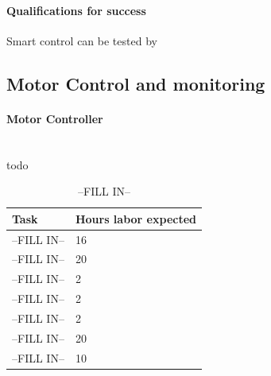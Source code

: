 \documentclass[12pt,article]{IEEEtran}
\begin{document}
	\paragraph{\bfseries Qualifications for success}
	Smart control can be tested by 
	
    \subsection{Motor Control and monitoring}
        \paragraph{Motor Controller}
        	\\todo
        
       
       
       \begin{table}[H]        
            \renewcommand{\arraystretch}{1.3}
        		\caption{--FILL IN--}
    			
    			\label{Estimated Time}
    			
    			\centering
    			\begin{tabular}{p{6cm}|p{1.6cm}}
    			\hline
    			\bfseries 	Task 			        	& \bfseries Hours labor expected     		   \\
    			\hline\hline
    						--FILL IN-- 		        & 16						    	            \\
    						--FILL IN--    	        	& 20			                                \\	
    						--FILL IN--         	    & 2				                                \\	
    						--FILL IN--             	& 2				                                \\
                            --FILL IN--                 & 2						                        \\
    						--FILL IN--             	& 20			                                \\	
    						--FILL IN--    	            & 10				                            \\	
    					    \hline
    			\end{tabular}
		\end{table}

\end{document}
